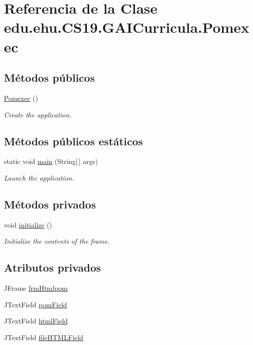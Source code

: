 \hypertarget{a00029}{}\section{Referencia de la Clase edu.\+ehu.\+C\+S19.\+G\+A\+I\+Curricula.\+Pomexec}
\label{a00029}
\subsection*{Métodos públicos}
\begin{DoxyCompactItemize}
\item 
\mbox{\hyperlink{a00029_a8de2bd06d0893d4f24ef2bd8216467cf}{Pomexec}} ()
\begin{DoxyCompactList}\small\item\em Create the application. \end{DoxyCompactList}\end{DoxyCompactItemize}
\subsection*{Métodos públicos estáticos}
\begin{DoxyCompactItemize}
\item 
static void \mbox{\hyperlink{a00029_a52ecabe81c9c3180cdccb3749b6553d6}{main}} (String\mbox{[}$\,$\mbox{]} args)
\begin{DoxyCompactList}\small\item\em Launch the application. \end{DoxyCompactList}\end{DoxyCompactItemize}
\subsection*{Métodos privados}
\begin{DoxyCompactItemize}
\item 
void \mbox{\hyperlink{a00029_ab89003495509c2f11da18c9675828571}{initialize}} ()
\begin{DoxyCompactList}\small\item\em Initialize the contents of the frame. \end{DoxyCompactList}\end{DoxyCompactItemize}
\subsection*{Atributos privados}
\begin{DoxyCompactItemize}
\item 
J\+Frame \mbox{\hyperlink{a00029_a1927e599316cd24b73c1148e28cb0532}{frm\+Htmlpom}}
\item 
J\+Text\+Field \mbox{\hyperlink{a00029_a7ea71ef0b61fa8df0b1689d11ce167cf}{pom\+Field}}
\item 
J\+Text\+Field \mbox{\hyperlink{a00029_a70bdb1d4b3b75dab759706ce0d85c9cf}{html\+Field}}
\item 
J\+Text\+Field \mbox{\hyperlink{a00029_ac458a48643144b5728bb22fdace1dada}{file\+H\+T\+M\+L\+Field}}
\end{DoxyCompactItemize}


